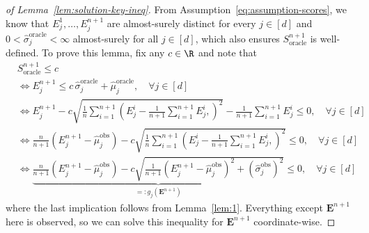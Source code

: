\begin{proof}[of Lemma~\ref{lem:solution-key-ineq}]
From Assumption~\ref{eq:assumption-scores}, we know that $E^1_j,\dots, E^{n+1}_j$ are almost-surely distinct for every $j \in [d]$ and $0<\hat{\sigma}^{\mathrm{oracle}}_j < \infty$ almost-surely for all $j \in [d]$, which also ensures $S_{\mathrm{oracle}}^{n+1}$ is well-defined. 
To prove this lemma, fix any $c \in \R$ and note that
\begin{align*}
    &S_{\mathrm{oracle}}^{n+1} \leq c \\
    &\iff E^{n+1}_j \leq c\,\hat{\sigma}^{\mathrm{oracle}}_j + \hat{\mu}^{\mathrm{oracle}}_j, \quad \forall j \in [d]\\
    &\iff {E^{n+1}_j - c\sqrt{\frac{1}{n}\sum^{n+1}_{i=1}\left(E^i_j -\frac{1}{n+1}\sum^{n+1}_{i=1}E^i_j, \right)^2} - \frac{1}{n+1}\sum^{n+1}_{i=1}E^i_j} \leq 0, \quad \forall j \in [d]\\
    &\iff {\frac{n}{n+1}\left(E^{n+1}_j-\hat{\mu}^\mathrm{obs}_j\right) - c\sqrt{\frac{1}{n}\sum^{n+1}_{i=1}\left(E^i_j -\frac{1}{n+1}\sum^{n+1}_{i=1}E^i_j, \right)^2}} \leq 0, \quad \forall j \in [d]\\
    &\iff \underbrace{\frac{n}{n+1}\left(E^{n+1}_j-\hat{\mu}^\mathrm{obs}_j\right) - c\sqrt{\frac{1}{n+1}\left(E^{n+1}_j-\hat{\mu}^\mathrm{obs}_j\right)^2+(\hat{\sigma}^\mathrm{obs}_j)^2}}_{=: g_j(\mathbf{E}^{n+1})} \leq 0, \quad \forall j \in [d]
\end{align*}
where the last implication follows from Lemma~\ref{lem:1}.
Everything except $\mathbf{E}^{n+1}$ here is observed, so we can solve this inequality for $\mathbf{E}^{n+1}$ coordinate-wise.


\end{proof}
